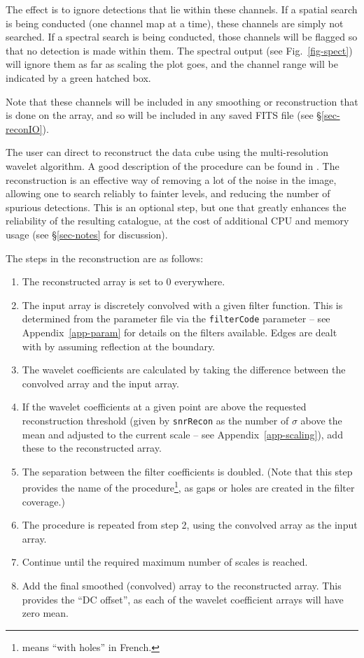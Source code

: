 The effect is to ignore detections that lie within these channels. If
a spatial search is being conducted (\ie one channel map at a time),
these channels are simply not searched. If a spectral search is being
conducted, those channels will be flagged so that no detection is made
within them. The spectral output (see Fig.~\ref{fig-spect}) will
ignore them as far as scaling the plot goes, and the channel range
will be indicated by a green hatched box.

Note that these channels will be included in any smoothing or
reconstruction that is done on the array, and so will be included in
any saved FITS file (see \S\ref{sec-reconIO}).

\label{sec-recon}

The user can direct \duchamp to reconstruct the data cube using the
multi-resolution \atrous wavelet algorithm. A good description of the
procedure can be found in \citet{starck02a}. The reconstruction is an
effective way of removing a lot of the noise in the image, allowing
one to search reliably to fainter levels, and reducing the number of
spurious detections. This is an optional step, but one that greatly
enhances the reliability of the resulting catalogue, at the cost of
additional CPU and memory usage (see \S\ref{sec-notes} for
discussion).


The steps in the \atrous reconstruction are as follows:
\begin{enumerate}
\item The reconstructed array is set to 0 everywhere.
\item The input array is discretely convolved with a given filter
  function. This is determined from the parameter file via the
  \texttt{filterCode} parameter -- see Appendix~\ref{app-param} for
  details on the filters available. Edges are dealt with by assuming
  reflection at the boundary.
\item The wavelet coefficients are calculated by taking the difference
  between the convolved array and the input array.
\item If the wavelet coefficients at a given point are above the
  requested reconstruction threshold (given by \texttt{snrRecon} as
  the number of $\sigma$ above the mean and adjusted to the current
  scale -- see Appendix~\ref{app-scaling}), add these to the
  reconstructed array.
\item The separation between the filter coefficients is doubled. (Note
  that this step provides the name of the procedure\footnote{\atrous
  means ``with holes'' in French.}, as gaps or holes are created in
  the filter coverage.)
\item The procedure is repeated from step 2, using the convolved array
  as the input array.
\item Continue until the required maximum number of scales is reached.
\item Add the final smoothed (\ie convolved) array to the
  reconstructed array. This provides the ``DC offset'', as each of the
  wavelet coefficient arrays will have zero mean.
\end{enumerate}

